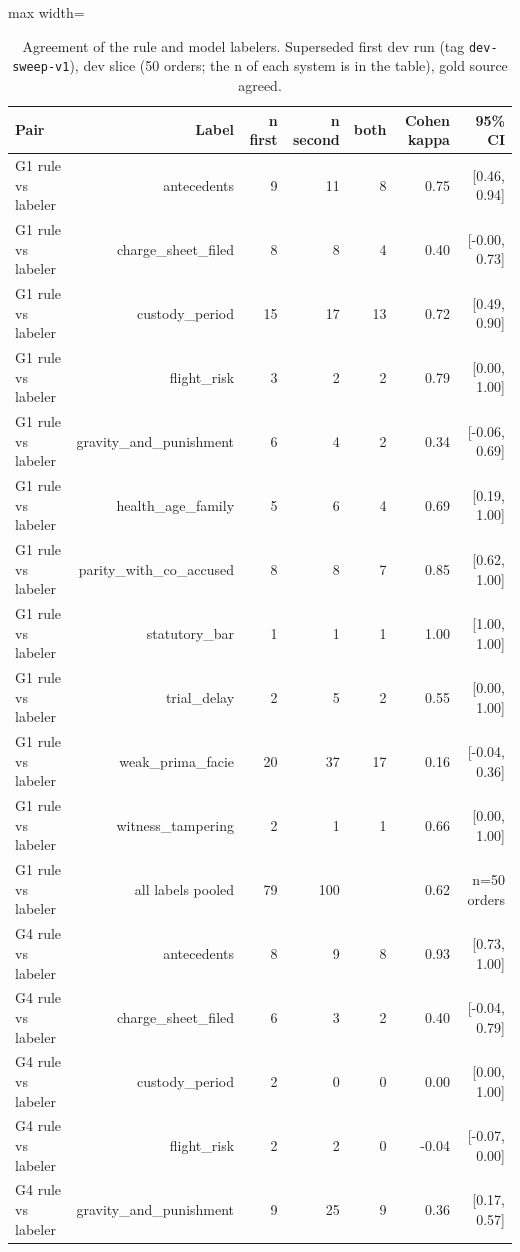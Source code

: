 \begin{table}[t]
\centering
\small
\caption{Agreement of the rule and model labelers. Superseded first dev run (tag \texttt{dev-sweep-v1}), dev slice (50 orders; the n of each system is in the table), gold source agreed.}
\label{tab:table_label_kappa}
\begin{adjustbox}{max width=\textwidth}
\begin{tabular}{lrrrrrr}
\toprule
Pair & Label & n first & n second & both & Cohen kappa & 95\% CI \\
\midrule
G1 rule vs labeler & antecedents & 9 & 11 & 8 & 0.75 & [0.46, 0.94] \\
G1 rule vs labeler & charge\_sheet\_filed & 8 & 8 & 4 & 0.40 & [-0.00, 0.73] \\
G1 rule vs labeler & custody\_period & 15 & 17 & 13 & 0.72 & [0.49, 0.90] \\
G1 rule vs labeler & flight\_risk & 3 & 2 & 2 & 0.79 & [0.00, 1.00] \\
G1 rule vs labeler & gravity\_and\_punishment & 6 & 4 & 2 & 0.34 & [-0.06, 0.69] \\
G1 rule vs labeler & health\_age\_family & 5 & 6 & 4 & 0.69 & [0.19, 1.00] \\
G1 rule vs labeler & parity\_with\_co\_accused & 8 & 8 & 7 & 0.85 & [0.62, 1.00] \\
G1 rule vs labeler & statutory\_bar & 1 & 1 & 1 & 1.00 & [1.00, 1.00] \\
G1 rule vs labeler & trial\_delay & 2 & 5 & 2 & 0.55 & [0.00, 1.00] \\
G1 rule vs labeler & weak\_prima\_facie & 20 & 37 & 17 & 0.16 & [-0.04, 0.36] \\
G1 rule vs labeler & witness\_tampering & 2 & 1 & 1 & 0.66 & [0.00, 1.00] \\
G1 rule vs labeler & all labels pooled & 79 & 100 &  & 0.62 & n=50 orders \\
G4 rule vs labeler & antecedents & 8 & 9 & 8 & 0.93 & [0.73, 1.00] \\
G4 rule vs labeler & charge\_sheet\_filed & 6 & 3 & 2 & 0.40 & [-0.04, 0.79] \\
G4 rule vs labeler & custody\_period & 2 & 0 & 0 & 0.00 & [0.00, 1.00] \\
G4 rule vs labeler & flight\_risk & 2 & 2 & 0 & -0.04 & [-0.07, 0.00] \\
G4 rule vs labeler & gravity\_and\_punishment & 9 & 25 & 9 & 0.36 & [0.17, 0.57] \\

\end{tabular}
\end{adjustbox}
\end{table}
